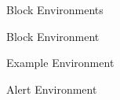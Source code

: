 \documentclass[aspectratio=169, sectionpages]{beamer}
\begin{document}
\begin{frame}{Block Environments}
	\begin{block}{Block Environment}
		\lipsum[1][1]
	\end{block}
	\begin{exampleblock}{Example Environment}
		\lipsum[1][1]
	\end{exampleblock}
	\begin{alertblock}{Alert Environment}
		\lipsum[1][1]
	\end{alertblock}
\end{frame}
\end{document}
